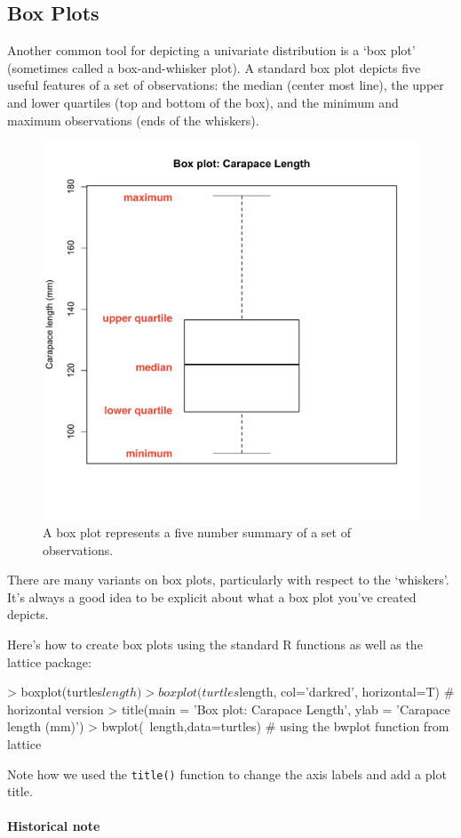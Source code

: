 \subsection{Box Plots}

Another common tool for depicting a univariate distribution is a `box
plot' (sometimes called a box-and-whisker plot). A standard box plot
depicts five useful features of a set of observations: the median
(center most line), the upper and lower quartiles (top and bottom of the
box), and the minimum and maximum observations (ends of the whiskers).

\begin{figure}[htbp]
\centering
\includegraphics[width=0.5\columnwidth]{./figures/hands-on2/boxplot-labeled.pdf}
\caption{A box plot represents a five number summary of a set of
observations.}
\end{figure}

There are many variants on box plots, particularly with respect to the
`whiskers'. It's always a good idea to be explicit about what a box plot
you've created depicts.

Here's how to create box plots using the standard R functions as well as
the lattice package:

\begin{R}
> boxplot(turtles$length)
> boxplot(turtles$length, col='darkred', horizontal=T) # horizontal version
> title(main = 'Box plot: Carapace Length', ylab = 'Carapace length (mm)')
> bwplot(~length,data=turtles) # using the bwplot function from lattice
\end{R}
Note how we used the \lstinline!title()! function to change the axis
labels and add a plot title.

\paragraph{Historical note}

